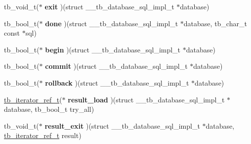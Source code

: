 \begin{DoxyCompactItemize}
\item 
\hypertarget{structtb__database__sql__impl__t_ae92e537312e8498c0c3001de248d6583}{tb\-\_\-void\-\_\-t($\ast$ {\bfseries exit} )(struct \-\_\-\-\_\-tb\-\_\-database\-\_\-sql\-\_\-impl\-\_\-t $\ast$database)}\label{structtb__database__sql__impl__t_ae92e537312e8498c0c3001de248d6583}

\item 
\hypertarget{structtb__database__sql__impl__t_a6d3979094b3c0f1fa3b13274c18c84f6}{tb\-\_\-bool\-\_\-t($\ast$ {\bfseries done} )(struct \-\_\-\-\_\-tb\-\_\-database\-\_\-sql\-\_\-impl\-\_\-t $\ast$database, tb\-\_\-char\-\_\-t const $\ast$sql)}\label{structtb__database__sql__impl__t_a6d3979094b3c0f1fa3b13274c18c84f6}

\item 
\hypertarget{structtb__database__sql__impl__t_a6639cff932be19f543b532d219fa51f7}{tb\-\_\-bool\-\_\-t($\ast$ {\bfseries begin} )(struct \-\_\-\-\_\-tb\-\_\-database\-\_\-sql\-\_\-impl\-\_\-t $\ast$database)}\label{structtb__database__sql__impl__t_a6639cff932be19f543b532d219fa51f7}

\item 
\hypertarget{structtb__database__sql__impl__t_a761c120c83e0bb4f67a483f8404ba3cf}{tb\-\_\-bool\-\_\-t($\ast$ {\bfseries commit} )(struct \-\_\-\-\_\-tb\-\_\-database\-\_\-sql\-\_\-impl\-\_\-t $\ast$database)}\label{structtb__database__sql__impl__t_a761c120c83e0bb4f67a483f8404ba3cf}

\item 
\hypertarget{structtb__database__sql__impl__t_a40b1ef7d2f59cfd917d96e916713805e}{tb\-\_\-bool\-\_\-t($\ast$ {\bfseries rollback} )(struct \-\_\-\-\_\-tb\-\_\-database\-\_\-sql\-\_\-impl\-\_\-t $\ast$database)}\label{structtb__database__sql__impl__t_a40b1ef7d2f59cfd917d96e916713805e}

\item 
\hypertarget{structtb__database__sql__impl__t_a0d1e6ac1442bc30e5b6cbcae21f7b158}{\hyperlink{iterator_8h_ac27e510c3327a31ba3bf561fbfafdd95}{tb\-\_\-iterator\-\_\-ref\-\_\-t}($\ast$ {\bfseries result\-\_\-load} )(struct \-\_\-\-\_\-tb\-\_\-database\-\_\-sql\-\_\-impl\-\_\-t $\ast$database, tb\-\_\-bool\-\_\-t try\-\_\-all)}\label{structtb__database__sql__impl__t_a0d1e6ac1442bc30e5b6cbcae21f7b158}

\item 
\hypertarget{structtb__database__sql__impl__t_a6ae61f30801407af6e07ac36746f15a2}{tb\-\_\-void\-\_\-t($\ast$ {\bfseries result\-\_\-exit} )(struct \-\_\-\-\_\-tb\-\_\-database\-\_\-sql\-\_\-impl\-\_\-t $\ast$database, \hyperlink{iterator_8h_ac27e510c3327a31ba3bf561fbfafdd95}{tb\-\_\-iterator\-\_\-ref\-\_\-t} result)}\label{structtb__database__sql__impl__t_a6ae61f30801407af6e07ac36746f15a2}


\end{DoxyCompactItemize}
